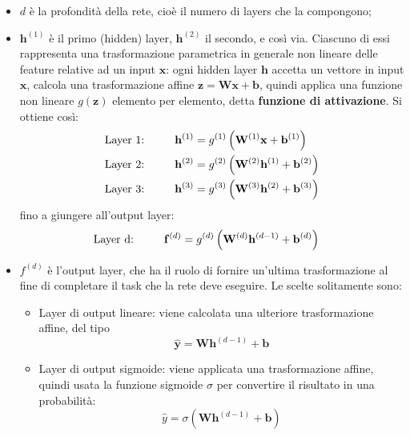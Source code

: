 \begin{itemize}
\item $d$ è la profondità della rete, cioè il numero di layers che la compongono;
\item $\mathbf{h}^{(1)}$ è il primo (hidden) layer, $\mathbf{h}^{(2)}$ il secondo, e così via. Ciascuno di essi rappresenta una trasformazione parametrica in generale non lineare delle feature relative ad un input $\mathbf{x}$: ogni hidden layer $\mathbf{h}$ accetta un vettore in input $\mathbf{x}$, calcola una
trasformazione affine $\mathbf{z}=\mathbf{W}\mathbf{x}+\mathbf{b}$, quindi applica una funzione non lineare $g(\mathbf{z})$
elemento per elemento, detta \textbf{funzione di attivazione}. Si ottiene così:
\begin{align*}
\text{Layer 1: } & \hspace{8mm}\mathbf{h}^{(1)}=g^{(1)}\left(\mathbf{W}^{(1)}\mathbf{x}+\mathbf{b}^{(1)}\right)\\
\text{Layer 2: } & \hspace{8mm}\mathbf{h}^{(2)}=g^{(2)}\left(\mathbf{W}^{(2)}\mathbf{h}^{(1)}+\mathbf{b}^{(2)}\right)\\
\text{Layer 3: } & \hspace{8mm}\mathbf{h}^{(3)}=g^{(3)}\left(\mathbf{W}^{(3)}\mathbf{h}^{(2)}+\mathbf{b}^{(3)}\right)
\end{align*}
fino a giungere all'output layer:
\begin{align*}
\text{Layer d: } & \hspace{8mm}\mathbf{f}^{(d)}=g^{(d)}\left(\mathbf{W}^{(d)}\mathbf{h}^{(d-1)}+\mathbf{b}^{(d)}\right)
\end{align*}
\item $f^{(d)}$ è l'output layer, che ha il ruolo di fornire un'ultima trasformazione al fine di completare il task che la rete deve eseguire. Le scelte solitamente sono:
\begin{itemize}
\item Layer di output lineare: viene calcolata una ulteriore trasformazione affine, del tipo
\begin{equation*}
\mathbf{\widehat{y}}=\mathbf{W}\mathbf{h}^{(d-1)}+\mathbf{b}
\end{equation*}
\item Layer di output sigmoide: viene applicata una trasformazione affine, quindi usata la funzione sigmoide $\sigma$ per convertire il risultato in una probabilità:
\begin{equation*}
\widehat{y}=\sigma\left(\mathbf{W}\mathbf{h}^{(d-1)}+\mathbf{b}\right)

\end{equation*}
\end{itemize}
\end{itemize}
